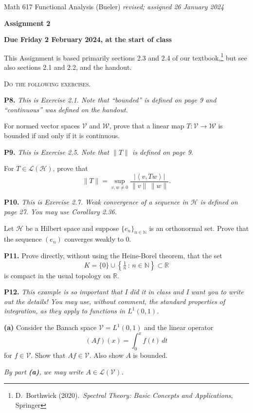 \documentclass[12pt]{amsart}
\newcommand{\cH}{\mathcal{H}}
\newcommand{\cL}{\mathcal{L}}
\newcommand{\cV}{\mathcal{V}}
\newcommand{\cW}{\mathcal{W}}
\newcommand{\NN}{\mathbb{N}}
\newcommand{\RR}{\mathbb{R}}
\newcommand{\ip}[2]{\ensuremath{\left<#1,#2\right>}}
\newcommand{\prob}[1]{\bigskip\noindent\textbf{#1.}\quad }
\newcommand{\epart}[1]{\medskip\noindent\textbf{(#1)}\quad }
\newcommand{\nex}{\medskip\noindent}
\begin{document}
\scriptsize \noindent Math 617 Functional Analysis (Bueler) \hfill \emph{revised; assigned 26 January 2024}
\normalsize\medskip

\Large\centerline{\textbf{Assignment 2}}
\large
\medskip

\centerline{\textbf{Due Friday 2 February 2024, at the start of class}}
\medskip
\normalsize

\thispagestyle{empty}

\bigskip
\noindent This Assignment is based primarily sections 2.3 and 2.4 of our textbook,\footnote{D.~Borthwick (2020).~\emph{Spectral Theory: Basic Concepts and Applications}, Springer} but see also sections 2.1 and 2.2, and the handout.

\medskip
\noindent \textsc{Do the following exercises.}
\smallskip

\prob{P8}  \emph{This is Exercise 2.1.  Note that ``bounded'' is defined on page 9 and ``continuous'' was defined on the handout.}

\nex For normed vector spaces $\cV$ and $\cW$, prove that a linear map $T:\cV\to\cW$ is bounded if and only if it is continuous.


\prob{P9}  \emph{This is Exercise 2.5.  Note that $\|T\|$ is defined on page 9.}

\nex For $T\in\cL(\cH)$, prove that
	$$\|T\| = \sup_{v,w\ne 0} \frac{|\ip{v}{Tw}|}{\|v\|\,\|w\|}.$$


\prob{P10}  \emph{This is Exercise 2.7.  Weak convergence of a sequence in $\cH$ is defined on page 27.  You may use Corollary 2.36.}

\nex Let $\cH$ be a Hilbert space and suppose $\{e_n\}_{n\in\NN}$ is an orthonormal set.  Prove that the sequence $(e_n)$ converges weakly to 0. 


\prob{P11}  Prove directly, without using the Heine-Borel theorem, that the set
	$$K = \{0\} \cup \left\{\tfrac{1}{n}\,:\,n \in \NN\right\} \subset \RR$$
is compact in the usual topology on $\RR$.


\clearpage \newpage
\prob{P12}  \emph{This example is so important that I did it in class \emph{and} I want you to write out the details!  You may use, without comment, the standard properties of integration, as they apply to functions in $L^1(0,1)$.}

\epart{a}  Consider the Banach space $\cV = L^1(0,1)$ and the linear operator
	$$(Af)(x) = \int_0^x f(t)\,dt$$
for $f\in\cV$.  Show that $Af \in \cV$.  Also show $A$ is bounded.

\nex \emph{By part \emph{\textbf{(a)}}, we may write $A\in\cL(\cV)$.}
\end{document}
